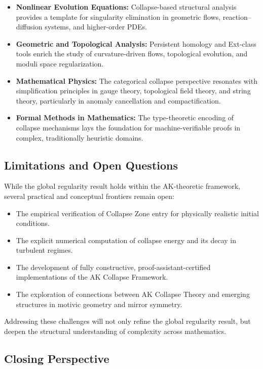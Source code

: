 \documentclass[11pt]{article}
\begin{document}
\begin{itemize}
  \item \textbf{Nonlinear Evolution Equations:} Collapse-based structural analysis provides a template for singularity elimination in geometric flows, reaction--diffusion systems, and higher-order PDEs.
  \item \textbf{Geometric and Topological Analysis:} Persistent homology and Ext-class tools enrich the study of curvature-driven flows, topological evolution, and moduli space regularization.
  \item \textbf{Mathematical Physics:} The categorical collapse perspective resonates with simplification principles in gauge theory, topological field theory, and string theory, particularly in anomaly cancellation and compactification.
  \item \textbf{Formal Methods in Mathematics:} The type-theoretic encoding of collapse mechanisms lays the foundation for machine-verifiable proofs in complex, traditionally heuristic domains.
\end{itemize}

\subsection{Limitations and Open Questions}

While the global regularity result holds within the AK-theoretic framework, several practical and conceptual frontiers remain open:

\begin{itemize}
  \item The empirical verification of Collapse Zone entry for physically realistic initial conditions.
  \item The explicit numerical computation of collapse energy and its decay in turbulent regimes.
  \item The development of fully constructive, proof-assistant-certified implementations of the AK Collapse Framework.
  \item The exploration of connections between AK Collapse Theory and emerging structures in motivic geometry and mirror symmetry.
\end{itemize}

Addressing these challenges will not only refine the global regularity result, but deepen the structural understanding of complexity across mathematics.

\subsection{Closing Perspective}
\end{document}
